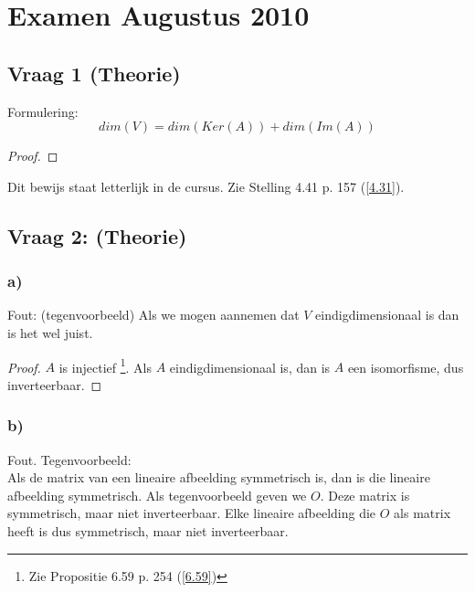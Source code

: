 \documentclass[lineaire_algebra_oplossingen.tex]{subfiles}
\begin{document}
\section{Examen Augustus 2010}
\subsection{Vraag 1 (Theorie)}
Formulering:
\[
dim(V) = dim(Ker(A)) + dim(Im(A))
\]
\begin{proof}
\end{proof}
Dit bewijs staat letterlijk in de cursus. Zie Stelling 4.41 p. 157 (\ref{4.31}).

\subsection{Vraag 2: (Theorie)}
\subsubsection*{a)}
Fout: (tegenvoorbeeld) Als we mogen aannemen dat $V$ eindigdimensionaal is dan is het wel juist.
\begin{proof}
$A$ is injectief \footnote{Zie Propositie 6.59 p. 254 (\ref{6.59})}.
Als $A$ eindigdimensionaal is, dan is $A$ een isomorfisme, dus inverteerbaar.
\end{proof}

\subsubsection*{b)}
Fout. Tegenvoorbeeld:\\
Als de matrix van een lineaire afbeelding symmetrisch is, dan is die lineaire afbeelding symmetrisch. Als tegenvoorbeeld geven we $O$. Deze matrix is symmetrisch, maar niet inverteerbaar. Elke lineaire afbeelding die $O$ als matrix heeft is dus symmetrisch, maar niet inverteerbaar.
\end{document}
